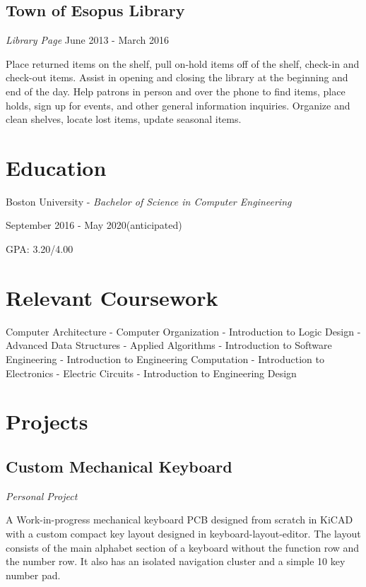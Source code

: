 \documentclass{article}
\begin{document}
\subsection{Town of Esopus Library} \textit{Library Page}
June 2013 - March 2016

Place returned items on the shelf, pull on-hold items off of the shelf, check-in and check-out items. Assist in opening and closing the library at the beginning and end of the day. Help patrons in person and over the phone to find items, place holds, sign up for events, and other general information inquiries. Organize and clean shelves, locate lost items, update seasonal items.

\vspace{-.75em}
\section{Education}
Boston University - \textit{Bachelor of Science in Computer Engineering}

September 2016 - May 2020(anticipated)

GPA: 3.20/4.00

\vspace{-.75em}
\section{Relevant Coursework}
{\centering
Computer Architecture - Computer Organization - Introduction to Logic Design - Advanced Data Structures - Applied Algorithms - Introduction to Software Engineering - Introduction to Engineering Computation - Introduction to Electronics - Electric Circuits - Introduction to Engineering Design
\par
}

\vspace{-.75em}
\section{Projects}
\subsection{Custom Mechanical Keyboard} \textit{Personal Project}

A Work-in-progress mechanical keyboard PCB designed from scratch in KiCAD with a custom compact key layout designed in keyboard-layout-editor. The layout consists of the main alphabet section of a keyboard without the function row and the number row. It also has an isolated navigation cluster and a simple 10 key number pad.
\vspace{-.75em}
\end{document}
